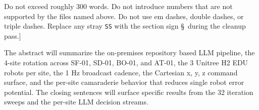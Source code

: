 \begin{sectionaccent}
Do not exceed roughly 300 words. Do not introduce numbers that are not
supported by the files named above. Do not use em dashes, double
dashes, or triple dashes. Replace any stray \texttt{SS} with the
section sign \S\ during the cleanup pass.]

The abstract will summarize the on-premises repository based LLM
pipeline, the 4-site rotation across SF-01, SD-01, BO-01, and AT-01,
the 3 Unitree H2 EDU robots per site, the 1 Hz broadcast cadence, the
Cartesian x, y, z command surface, and the per-site camaraderie
behavior that reduces single robot error potential. The closing
sentences will surface specific results from the 32 iteration sweeps
and the per-site LLM decision streams.


\end{sectionaccent}
